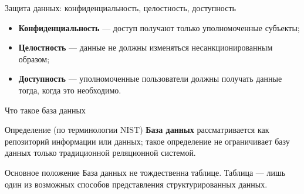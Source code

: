 \documentclass[aspectratio=169]{beamer}
\begin{document}
\begin{frame}{Защита данных: конфиденциальность, целостность, доступность}

\begin{center}
\end{center}

\begin{itemize}
  \item \textbf{Конфиденциальность} — доступ получают только
        уполномоченные субъекты;
  \item \textbf{Целостность} — данные не должны изменяться
        несанкционированным образом;
  \item \textbf{Доступность} — уполномоченные пользователи
        должны получать данные тогда, когда это необходимо.
\end{itemize}

\end{frame}



\begin{frame}{Что такое база данных}

\begin{block}{Определение (по терминологии NIST)}
\textbf{База данных} рассматривается как репозиторий
информации или данных; такое определение не ограничивает
базу данных только традиционной реляционной системой.
\end{block}

\vspace{0.4cm}

\begin{alertblock}{Основное положение}
База данных не тождественна таблице.
Таблица — лишь один из возможных способов
представления структурированных данных.
\end{alertblock}

\end{frame}
\end{document}
